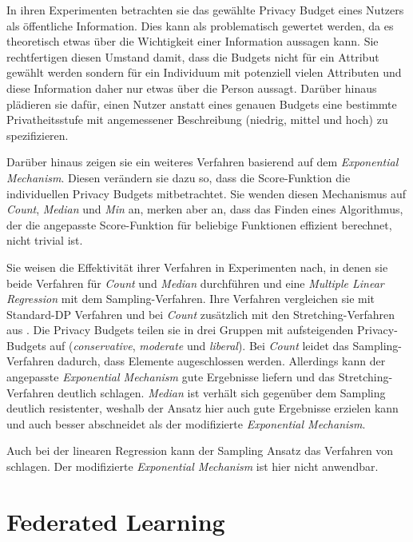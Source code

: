 In ihren Experimenten betrachten sie das gewählte Privacy Budget eines Nutzers als öffentliche Information. Dies kann als problematisch gewertet werden, da es theoretisch etwas über die Wichtigkeit einer Information aussagen kann. Sie rechtfertigen diesen Umstand damit, dass die Budgets nicht für ein Attribut gewählt werden sondern für ein Individuum mit potenziell vielen Attributen und diese Information daher nur etwas über die Person aussagt. Darüber hinaus plädieren sie dafür, einen Nutzer anstatt eines genauen Budgets eine bestimmte Privatheitsstufe mit angemessener Beschreibung (niedrig, mittel und hoch) zu spezifizieren.

Darüber hinaus zeigen sie ein weiteres Verfahren basierend auf dem \textit{Exponential Mechanism}. Diesen verändern sie dazu so, dass die Score-Funktion die individuellen Privacy Budgets mitbetrachtet. Sie wenden diesen Mechanismus auf \textit{Count}, \textit{Median} und \textit{Min} an, merken aber an, dass das Finden eines Algorithmus, der die angepasste Score-Funktion für beliebige Funktionen effizient berechnet, nicht trivial ist.

Sie weisen die Effektivität ihrer Verfahren in Experimenten nach, in denen sie beide Verfahren für \textit{Count} und \textit{Median} durchführen und eine \textit{Multiple Linear Regression} mit dem Sampling-Verfahren. Ihre Verfahren vergleichen sie mit Standard-DP Verfahren und bei \textit{Count} zusätzlich mit den Stretching-Verfahren aus \cite{alaggan:2016}. Die Privacy Budgets teilen sie in drei Gruppen mit aufsteigenden Privacy-Budgets auf (\textit{conservative}, \textit{moderate} und \textit{liberal}). Bei \textit{Count} leidet das Sampling-Verfahren dadurch, dass Elemente augeschlossen werden. Allerdings kann der angepasste \textit{Exponential Mechanism} gute Ergebnisse liefern und das Stretching-Verfahren deutlich schlagen. \textit{Median} ist verhält sich gegenüber dem Sampling deutlich resistenter, weshalb der Ansatz hier auch gute Ergebnisse erzielen kann und auch besser abschneidet als der modifizierte \textit{Exponential Mechanism}. 

Auch bei der linearen Regression kann der Sampling Ansatz das Verfahren von \cite{alaggan:2016} schlagen. Der modifizierte \textit{Exponential Mechanism} ist hier nicht anwendbar.

\section{Federated Learning}\label{fund-fl}

